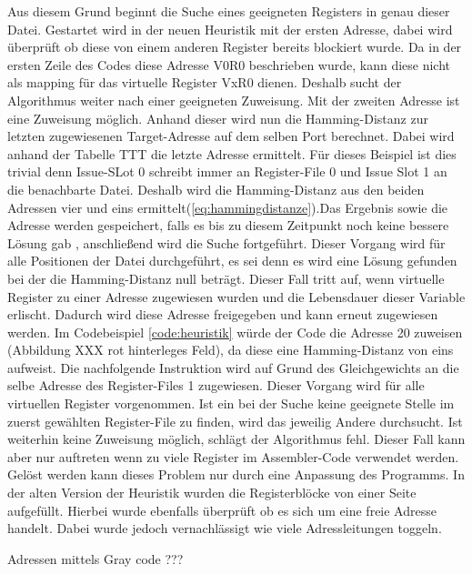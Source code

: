 Aus diesem Grund beginnt die Suche eines geeigneten Registers in genau dieser Datei. Gestartet wird in der neuen Heuristik mit der ersten Adresse, dabei wird überprüft ob diese von einem anderen Register bereits blockiert wurde. Da in der ersten Zeile des Codes diese Adresse V0R0 beschrieben wurde, kann diese nicht als mapping für das virtuelle Register VxR0 dienen. Deshalb sucht der Algorithmus weiter nach einer geeigneten Zuweisung. Mit der zweiten Adresse ist eine Zuweisung möglich. Anhand dieser wird nun die Hamming-Distanz zur letzten zugewiesenen Target-Adresse auf dem selben Port berechnet. Dabei wird anhand der Tabelle TTT die letzte Adresse ermittelt. Für dieses Beispiel ist dies trivial denn Issue-SLot 0 schreibt immer an Register-File 0 und Issue Slot 1 an die benachbarte Datei. Deshalb wird die Hamming-Distanz aus den beiden Adressen vier und eins ermittelt(\ref{eq:hammingdistanze}).Das Ergebnis sowie die Adresse werden gespeichert, falls es bis zu diesem Zeitpunkt noch keine bessere Lösung gab , anschließend wird die Suche fortgeführt. Dieser Vorgang wird für alle Positionen der Datei durchgeführt, es sei denn es wird eine Lösung gefunden bei der die Hamming-Distanz null beträgt. Dieser Fall tritt auf, wenn virtuelle Register zu einer Adresse zugewiesen wurden und die Lebensdauer dieser Variable erlischt. Dadurch wird diese Adresse freigegeben und kann erneut zugewiesen werden. Im Codebeispiel \ref{code:heuristik} würde der Code die Adresse 20 zuweisen (Abbildung XXX rot hinterleges Feld), da diese eine Hamming-Distanz von eins aufweist.
Die nachfolgende Instruktion wird auf Grund des Gleichgewichts an die selbe Adresse des Register-Files 1 zugewiesen. Dieser Vorgang wird für alle virtuellen Register vorgenommen. Ist ein bei der Suche keine geeignete Stelle im zuerst gewählten Register-File zu finden, wird das jeweilig Andere durchsucht. Ist weiterhin keine Zuweisung möglich, schlägt der Algorithmus fehl. Dieser Fall kann aber nur auftreten wenn zu viele Register im Assembler-Code verwendet werden. Gelöst werden kann dieses Problem nur durch eine Anpassung des Programms.
In der alten Version der Heuristik wurden die Registerblöcke von einer Seite aufgefüllt. Hierbei wurde ebenfalls überprüft ob es sich um eine freie Adresse handelt. Dabei wurde jedoch vernachlässigt wie viele Adressleitungen toggeln. 

Adressen mittels Gray code ??? 

